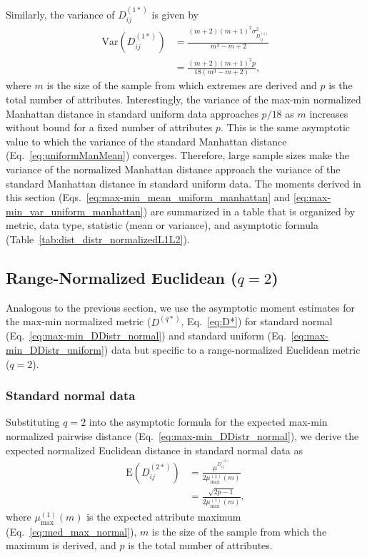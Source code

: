 \documentclass[aos]{imsart}
\begin{document}
Similarly, the variance of $D^{(1*)}_{ij}$ is given by
%
\begin{equation}\label{eq:max-min_var_uniform_manhattan}
\begin{aligned}
\text{Var}\left(D^{(1*)}_{ij}\right) &= \frac{(m+2)(m+1)^2\sigma^2_{D^{(1)}_{ij}}}{m^3-m+2} \\
&= \frac{(m+2)(m+1)^2p}{18(m^3 - m + 2)},
\end{aligned}
\end{equation}
%
where $m$ is the size of the sample from which extremes are derived and $p$ is the total number of attributes. Interestingly, the variance of the max-min normalized Manhattan distance in standard uniform data approaches $p/18$ as $m$ increases without bound for a fixed number of attributes $p$. This is the same asymptotic value to which the variance of the standard Manhattan distance (Eq.~\ref{eq:uniformManMean}) converges. Therefore, large sample sizes make the variance of the normalized Manhattan distance approach the variance of the standard Manhattan distance in standard uniform data. The moments derived in this section (Eqs.~\ref{eq:max-min_mean_uniform_manhattan} and \ref{eq:max-min_var_uniform_manhattan}) are summarized in a table that is organized by metric, data type, statistic (mean or variance), and asymptotic formula (Table~\ref{tab:dist_distr_normalizedL1L2}).

\subsection{Range-Normalized Euclidean \texorpdfstring{($q=2$)}{}}

Analogous to the previous section, we use the asymptotic moment estimates for the max-min normalized metric ($D^{(q*)}$, Eq.~\ref{eq:D*}) for standard normal (Eq.~\ref{eq:max-min_DDistr_normal}) and standard uniform (Eq.~\ref{eq:max-min_DDistr_uniform}) data but specific to a range-normalized Euclidean metric ($q=2$).

\subsubsection{Standard normal data}

Substituting $q=2$ into the asymptotic formula for the expected max-min normalized pairwise distance (Eq.~\ref{eq:max-min_DDistr_normal}), we derive the expected normalized Euclidean distance in standard normal data as
%
\begin{equation}\label{eq:max-min_mean_normal_euclidean}
\begin{aligned}
\text{E}\left(D^{(2*)}_{ij}\right) &= \frac{\mu^{D^{(2)}_{ij}}}{2\mu^{(1)}_\text{max}(m)} \\
&= \frac{\sqrt{2p - 1}}{2\mu^{(1)}_\text{max}(m)},
\end{aligned}
\end{equation}
%
where $\mu^{(1)}_\text{max}(m)$ is the expected attribute maximum (Eq.~\ref{eq:med_max_normal}), $m$ is the size of the sample from which the maximum is derived, and $p$ is the total number of attributes.
\end{document}
